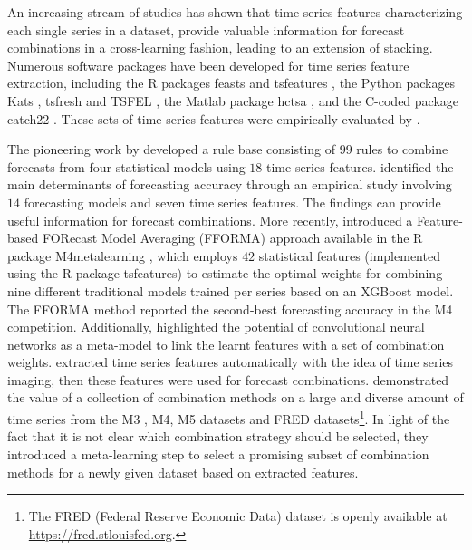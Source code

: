 \documentclass[11pt]{article}
\newcommand{\pkg}[1]{{\normalfont\fontseries{b}\selectfont #1}}
\let\proglang=\textsf
\begin{document}
An increasing stream of studies has shown that time series features characterizing each single series in a dataset, provide valuable information for forecast combinations in a cross-learning fashion, leading to an extension of stacking. Numerous software packages have been developed for time series feature extraction, including the \proglang{R} packages \pkg{feasts} \citep{rfeasts} and \pkg{tsfeatures} \citep{rtsfeatures}, the \proglang{Python} packages \pkg{Kats} \citep{pKats}, \pkg{tsfresh} \citep{Christ2018-vi} and \pkg{TSFEL} \citep{Barandas2020-vr}, the \proglang{Matlab} package \pkg{hctsa} \citep{Fulcher2017-uf}, and the \proglang{C}-coded package \pkg{catch22} \citep{Lubba2019-ds}. These sets of time series features were empirically evaluated by \citet{Henderson2021-gl}.

The pioneering work by \citet{Collopy1992-ey} developed a rule base consisting of $99$ rules to combine forecasts from four statistical models using $18$ time series features. \citet{Petropoulos2014-uy} identified the main determinants of forecasting accuracy through an empirical study involving $14$ forecasting models and seven time series features. The findings can provide useful information for forecast combinations. More recently, \citet{Montero-Manso2020-tq} introduced a Feature-based FORecast Model Averaging (FFORMA) approach available in the \proglang{R} package \pkg{M4metalearning} \citep{rfforma}, which employs $42$ statistical features (implemented using the \proglang{R} package \pkg{tsfeatures}) to estimate the optimal weights for combining nine different traditional models trained per series based on an XGBoost model. The FFORMA method reported the second-best forecasting accuracy in the M4 competition. Additionally, \citet{Ma2021-np} highlighted the potential of convolutional neural networks as a meta-model to link the learnt features with a set of combination weights. \citet{Li2020-od} extracted time series features automatically with the idea of time series imaging, then these features were used for forecast combinations. \citet{Gastinger2021-ey} demonstrated the value of a collection of combination methods on a large and diverse amount of time series from the M3 \citep{Makridakis2000-he}, M4, M5 \citep{Makridakis2020-fn} datasets and FRED datasets\footnote{The FRED (Federal Reserve Economic Data) dataset is openly available at \url{https://fred.stlouisfed.org}.}. In light of the fact that it is not clear which combination strategy should be selected, they introduced a meta-learning step to select a promising subset of combination methods for a newly given dataset based on extracted features.
\end{document}
